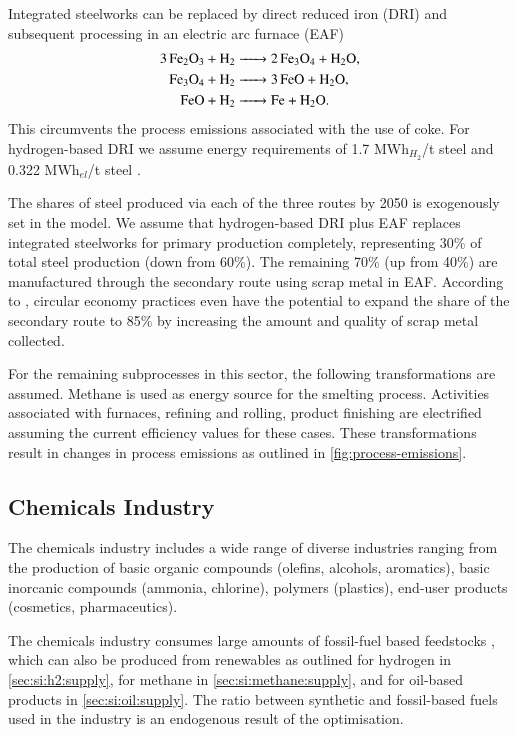 Integrated steelworks can be replaced by direct reduced iron (DRI) and subsequent processing in an electric arc furnace (EAF)
\begin{align}
    \ce{3Fe2O3 + H2 &-> 2Fe3O4 + H2O}, \\
    \ce{Fe3O4 + H2 &-> 3FeO + H2O}, \\
    \ce{FeO + H2 &-> Fe + H2O}.
\end{align}
This circumvents the process emissions associated with the use of coke. For
hydrogen-based DRI we assume energy requirements of 1.7 MWh$_{H_2}$/t steel
 and 0.322 MWh$_{el}$/t steel
\citeS{}.

The shares of steel produced via each of the three routes by 2050 is exogenously
set in the model. We assume that hydrogen-based DRI plus EAF replaces integrated
steelworks for primary production completely, representing 30\% of total steel
production (down from 60\%). The remaining 70\% (up from 40\%) are manufactured
through the secondary route using scrap metal in EAF. According to
, circular economy practices even have the potential to
expand the share of the secondary route to 85\% by increasing the amount and
quality of scrap metal collected.

For the remaining subprocesses in this sector, the following transformations are
assumed. Methane is used as energy source for the smelting process. Activities
associated with furnaces, refining and rolling, product finishing are
electrified assuming the current efficiency values for these cases.
These transformations result in changes in process emissions as outlined in \cref{fig:process-emissions}.


\subsection{Chemicals Industry}
\label{sec:si:industry:chemicals}

The chemicals industry includes a wide range of diverse industries ranging from
the production of basic organic compounds (olefins, alcohols, aromatics), basic
inorcanic compounds (ammonia, chlorine), polymers (plastics), end-user products
(cosmetics, pharmaceutics).

The chemicals industry consumes large amounts of fossil-fuel based feedstocks
, which can also be produced from renewables as
outlined for hydrogen in \cref{sec:si:h2:supply}, for methane in
\cref{sec:si:methane:supply}, and for oil-based products in
\cref{sec:si:oil:supply}. The ratio between synthetic and fossil-based fuels
used in the industry is an endogenous result of the optimisation.

